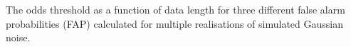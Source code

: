 \label{fig:changepoint}
The odds threshold as a function of data length for three different false alarm probabilities (FAP) calculated for
multiple realisations of simulated Gaussian noise. 
